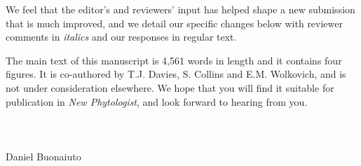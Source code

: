 \documentclass{article}[12pt]
\begin{document}
We feel that the editor's and reviewers' input has helped shape a new submission that is much improved, and we detail our specific changes below with reviewer comments in \emph{italics} and our responses in regular text.

The main text of this manuscript is 4,561 words in length and it contains four figures. It is co-authored
by T.J. Davies, S. Collins and E.M. Wolkovich, and is not under consideration elsewhere. We hope that you will find it suitable for publication in \emph{New Phytologist}, and look forward to hearing from you.\\\\\\\\

\noindent Daniel Buonaiuto\\
\pagebreak
 
\end{document}
